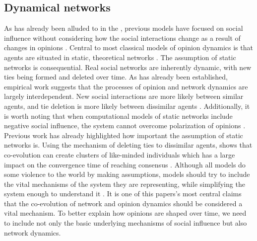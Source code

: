 \documentclass[11pt]{article}
\begin{document}
\subsection{Dynamical networks}
As has already been alluded to in the \textit{}, previous models have focused on social influence without considering how the social interactions change as a result of changes in opinions \cite{galesic_integrating_2021,holme_nonequilibrium_2006,jalili_coevolution_2015}. Central to most classical models of opinion dynamics is that agents are situated in static, theoretical networks \cite{flache_models_2017}. The assumption of static networks is consequential. Real social networks are inherently dynamic, with new ties being formed and deleted over time. As has already been established, empirical work suggests that the processes of opinion and network dynamics are largely interdependent. New social interactions are more likely between similar agents, and tie deletion is more likely between dissimilar agents \cite{kossinets_origins_2009, bener_empirical_2016}. Additionally, it is worth noting that when computational models of static networks include negative social influence, the system cannot overcome polarization of opinions \cite{flache_models_2017, kozma2008consensus}. Previous work has already highlighted how important the assumption of static networks is. Using the mechanism of deleting ties to dissimilar agents,  shows that co-evolution can create clusters of like-minded individuals which has a large impact on the convergence time of reaching consensus \cite{kozma2008consensus}. 
Although all models do some violence to the world by making assumptions, models should try to include the vital mechanisms of the system they are representing, while simplifying the system enough to understand it \cite{epstein1999agent,smaldino_models_2016}. It is one of this papers's most central claims that the co-evolution of network and opinion dynamics should be considered a vital mechanism. To better explain how opinions are shaped over time, we need to include not only the basic underlying mechanisms of social influence but also network dynamics. 
\end{document}
